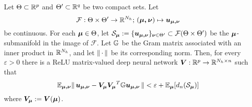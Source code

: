 \begin{lemma} \label{lemma: DOD Existence}

    
    Let $\Theta \subset \mathbb{R}^p$ and $\Theta' \subset \mathbb{R}^{q}$ be two compact sets. Let
    \begin{equation*}
        \mathcal{F}: \Theta \times \Theta' \to \mathbb{R}^{N_h}; \,  (\boldsymbol{\mu, \nu}) \mapsto \boldsymbol{u_{\mu, \nu}}
    \end{equation*}
    be continuous. For each $\boldsymbol{\mu} \in \Theta$, let $\mathcal{S}_{\boldsymbol{\mu}} := \{ \boldsymbol{u_{\mu, \nu}} \}_{\boldsymbol{\nu} \in \Theta'} \subset \mathcal{F}(\Theta \times \Theta')$ be the $\boldsymbol{\mu}$-submanifold in the image of $\mathcal{F}$. Let $\mathbb{G}$ be the Gram matrix associated with an inner product in $\mathbb{R}^{N_h}$, and let $\lVert \, \cdot \, \rVert$ be its corresponding norm. Then, for every $\varepsilon > 0$ there is a ReLU matrix-valued deep neural network $\boldsymbol{V}: \mathbb{R}^p \to \mathbb{R}^{N_h \times n}$ such that
    \begin{equation*}
        \mathbb{E}_{\boldsymbol{\mu, \nu}} \lVert \, \boldsymbol{u_{\mu, \nu}} - \boldsymbol{V_{\mu} V_{\mu}}^T \mathbb{G} \boldsymbol{u_{\mu, \nu}} \, \rVert < \varepsilon + \mathbb{E}_{\boldsymbol{\mu}}[d_n(\mathcal{S}_{\boldsymbol{\mu}})]
    \end{equation*}
    where $\boldsymbol{V_{\mu}} := \boldsymbol{V}(\boldsymbol{\mu})$.
\end{lemma}
